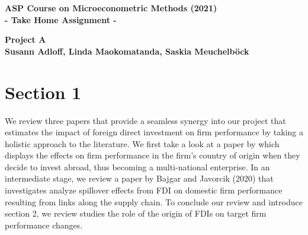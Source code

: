 \documentclass[11pt,a4paper,leqno]{article}
\begin{document}
 \begin{center}
	\begin{LARGE}
		\textbf{
			ASP Course on Microeconometric Methods (2021)\\
			 - Take Home Assignment -\\
		}
	\end{LARGE}
	\vspace{0.2cm}
	{\large \textbf{Project A}} \\\vspace{0.2cm}
	{\large \textbf{Susann Adloff, Linda Maokomatanda, Saskia Meuchelböck}} \vspace{0.2cm}
\end{center}

\section*{Section 1}
We review three papers that provide a seamless synergy into our project that estimates the impact of foreign direct investment on firm performance by taking a holistic approach to the literature. We first take a look at a paper by \cite{borin2016foreign} which displays the effects on firm performance in the firm’s country of origin when they decide to invest abroad, thus becoming a multi-national enterprise. In an intermediate stage, we review a paper by Bajgar and Javorcik (2020)  that investigates analyze spillover effects from FDI on domestic firm performance resulting from links along the supply chain. To conclude our review and introduce section 2, we review \cite{chen2011} studies the role of the origin of FDIs on target firm performance changes.
\end{document}
